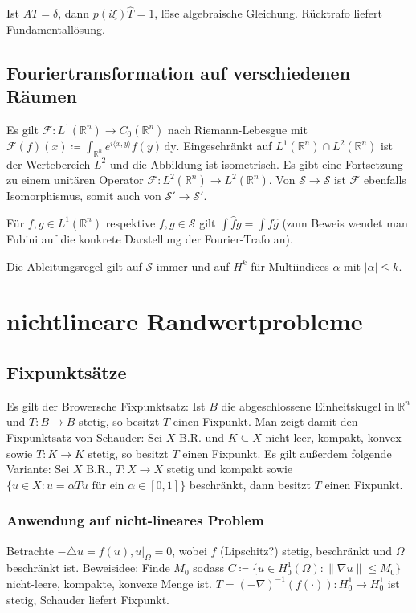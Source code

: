 \documentclass[11pt,a4paper]{scrartcl}
\newcommand{\R}{\mathbb{R}} %
\newcommand{\Sc}{\mathcal{S}}
\newcommand{\F}{\mathcal{F}}
\newcommand{\laplace}{\triangle}
\theoremstyle{plain}
\theoremstyle{definition}
\theoremstyle{remark}
\begin{document}
Ist $AT=\delta$, dann $p(i\xi)\hat T = 1$, löse algebraische Gleichung. Rücktrafo liefert Fundamentallösung.

\subsection{Fouriertransformation auf verschiedenen Räumen}

Es gilt $\F: L^1(\R^n) \to C_0(\R^n)$ nach Riemann-Lebesgue mit $\F(f)(x)\coloneqq \int_{\R^n} e^{i\langle x,y \rangle}f(y) \, \mathrm{dy}$. Eingeschränkt auf $L^1(\R^n) \cap L^2(\R^n)$ ist der Wertebereich $L^2$ und die Abbildung ist isometrisch. Es gibt eine Fortsetzung zu einem unitären Operator $\F: L^2(\R^n)\to L^2(\R^n)$. Von $\Sc\to \Sc$ ist $\F$ ebenfalls Isomorphismus, somit auch von $\Sc'\to \Sc'$.

Für $f,g\in L^1(\R^n)$ respektive $f,g\in \Sc$ gilt $\int \hat f g = \int f \hat g$ (zum Beweis wendet man Fubini auf die konkrete Darstellung der Fourier-Trafo an).

Die Ableitungsregel gilt auf $\Sc$ immer und auf $H^k$ für Multiindices $\alpha$ mit $|\alpha| \leq k$.

\section{nichtlineare Randwertprobleme}

\subsection{Fixpunktsätze}

Es gilt der Browersche Fixpunktsatz: Ist $B$ die abgeschlossene Einheitskugel in $\R^n$ und $T:B\to B$ stetig, so besitzt $T$ einen Fixpunkt. Man zeigt damit den Fixpunktsatz von Schauder: Sei $X$ B.R. und $K\subseteq X$ nicht-leer, kompakt, konvex sowie $T:K\to K$ stetig, so besitzt $T$ einen Fixpunkt. Es gilt außerdem folgende Variante: Sei $X$ B.R., $T:X\to X$ stetig und kompakt sowie $\{ u\in X: u = \alpha Tu \text{ für ein } \alpha \in [0,1]\}$ beschränkt, dann besitzt $T$ einen Fixpunkt.

\subsubsection{Anwendung auf nicht-lineares Problem}

Betrachte $-\laplace u = f(u), u|_\Omega = 0$, wobei $f$ (Lipschitz?) stetig, beschränkt und $\Omega$ beschränkt ist. Beweisidee: Finde $M_0$ sodass $C\coloneqq \{ u\in H^1_0(\Omega): \|\nabla u\| \leq M_0\}$ nicht-leere, kompakte, konvexe Menge ist. $T = (-\nabla)^{-1}(f(\cdot)): H^1_0\to H^1_0$ ist stetig, Schauder liefert Fixpunkt.
\end{document}
